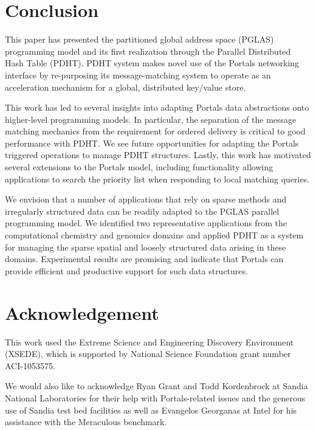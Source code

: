 \section{Conclusion}

This paper has presented the partitioned global address space (PGLAS)
programming model and its first realization through the Parallel Distributed
Hash Table (PDHT).  PDHT system makes novel use of the Portals networking
interface by re-purposing its message-matching system to operate as an
acceleration mechanism for a global, distributed key/value store.

This work has led to several insights into adapting Portals data abstractions
onto higher-level programming models. In particular, the separation of the
message matching mechanics from the requirement for ordered delivery is
critical to good performance with PDHT. We see future opportunities for
adapting the Portals triggered operations to manage PDHT structures. Lastly,
this work has motivated several extensions to the Portals model, including
functionality allowing applications to search the priority list when responding
to local matching queries.

We envision that a number of applications that rely on sparse methods and
irregularly structured data can be readily adapted to the PGLAS parallel
programming model.  We identified two representative applications from the
computational chemistry and genomics domains and applied PDHT as a system for
managing the sparse spatial and loosely structured data arising in these
domains.  Experimental results are promising and indicate that Portals can
provide efficient and productive support for such data structures.

\section*{Acknowledgement}

This work used the Extreme Science and Engineering Discovery Environment
(XSEDE), which is supported by National Science Foundation grant number
ACI-1053575.

We would also like to acknowledge Ryan Grant and Todd Kordenbrock at Sandia
National Laboratories for their help with Portals-related issues and the
generous use of Sandia test bed facilities as well as Evangelos Georganas at
Intel for his assistance with the Meraculous benchmark.
